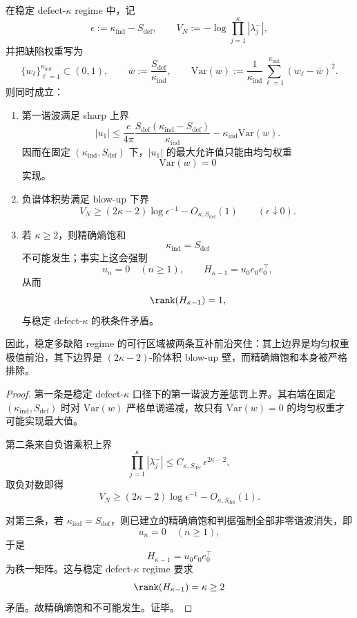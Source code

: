 \begin{theorem}[均匀权重前沿与精确熵饱和的排斥律]\label{thm:conclusion-defect-uniform-frontier-entropy-saturation-exclusion}
在稳定 defect-\(\kappa\) regime 中，记
\[
\epsilon:=\kappa_{\mathrm{ind}}-S_{\mathrm{def}},
\qquad
V_N:=-\log\prod_{j=1}^{\kappa}|\lambda_j^-|,
\]
并把缺陷权重写为
\[
\{w_\ell\}_{\ell=1}^{\kappa_{\mathrm{ind}}}\subset(0,1),
\qquad
\bar w:=\frac{S_{\mathrm{def}}}{\kappa_{\mathrm{ind}}},
\qquad
\mathrm{Var}(w):=
\frac{1}{\kappa_{\mathrm{ind}}}
\sum_{\ell=1}^{\kappa_{\mathrm{ind}}}(w_\ell-\bar w)^2.
\]
则同时成立：
\begin{enumerate}
  \item 第一谐波满足 sharp 上界
  \[
  |u_1|
  \le
  \frac{e}{4\pi}
  \frac{S_{\mathrm{def}}(\kappa_{\mathrm{ind}}-S_{\mathrm{def}})}{\kappa_{\mathrm{ind}}}
  -\kappa_{\mathrm{ind}}\mathrm{Var}(w).
  \]
  因而在固定 \((\kappa_{\mathrm{ind}},S_{\mathrm{def}})\) 下，\(|u_1|\) 的最大允许值只能由均匀权重
  \[
  \mathrm{Var}(w)=0
  \]
  实现。
  \item 负谱体积势满足 blow-up 下界
  \[
  V_N\ge (2\kappa-2)\log \epsilon^{-1}-O_{\kappa,S_{\mathrm{def}}}(1)
  \qquad(\epsilon\downarrow 0).
  \]
  \item 若 \(\kappa\ge 2\)，则精确熵饱和
  \[
  \kappa_{\mathrm{ind}}=S_{\mathrm{def}}
  \]
  不可能发生；事实上这会强制
  \[
  u_n=0\quad(n\ge 1),\qquad
  H_{\kappa-1}=u_0e_0e_0^\top,
  \]
  从而
  \[
  \rank(H_{\kappa-1})=1,
  \]
  与稳定 defect-\(\kappa\) 的秩条件矛盾。
\end{enumerate}
因此，稳定多缺陷 regime 的可行区域被两条互补前沿夹住：其上边界是均匀权重极值前沿，其下边界是 \((2\kappa-2)\)-阶体积 blow-up 壁，而精确熵饱和本身被严格排除。
\end{theorem}

\begin{proof}
第一条是稳定 defect-\(\kappa\) 口径下的第一谐波方差惩罚上界。其右端在固定 \((\kappa_{\mathrm{ind}},S_{\mathrm{def}})\) 时对 \(\mathrm{Var}(w)\) 严格单调递减，故只有 \(\mathrm{Var}(w)=0\) 的均匀权重才可能实现最大值。

第二条来自负谱乘积上界
\[
\prod_{j=1}^{\kappa}|\lambda_j^-|
\le
C_{\kappa,S_{\mathrm{def}}}\,\epsilon^{2\kappa-2},
\]
取负对数即得
\[
V_N\ge (2\kappa-2)\log \epsilon^{-1}-O_{\kappa,S_{\mathrm{def}}}(1).
\]

对第三条，若 \(\kappa_{\mathrm{ind}}=S_{\mathrm{def}}\)，则已建立的精确熵饱和判据强制全部非零谐波消失，即
\[
u_n=0\quad(n\ge 1),
\]
于是
\[
H_{\kappa-1}=u_0e_0e_0^\top
\]
为秩一矩阵。这与稳定 defect-\(\kappa\) regime 要求
\[
\rank(H_{\kappa-1})=\kappa\ge 2
\]
矛盾。故精确熵饱和不可能发生。证毕。
\end{proof}


